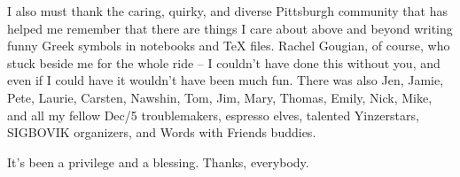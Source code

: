 \documentclass[12pt]{cmuthesis}
\begin{document}
\begin{acknowledgments}
  I also must thank the caring, quirky, and diverse Pittsburgh
  community that has helped me remember that there are things I care
  about above and beyond writing funny Greek symbols in notebooks and
  TeX files.  Rachel Gougian, of course, who stuck beside me for the
  whole ride -- I couldn't have done this without you, and even if I
  could have it wouldn't have been much fun. There was also Jen,
  Jamie, Pete, Laurie, Carsten, Nawshin, Tom, Jim, Mary, Thomas,
  Emily, Nick, Mike, and all my fellow Dec/5 troublemakers, espresso
  elves, talented Yinzerstars, SIGBOVIK organizers, and Words with
  Friends buddies.  

  It's been a privilege and a blessing. Thanks, everybody.

\end{acknowledgments}



\tableofcontents
\listoffigures %

\mainmatter


%
%
%
%
%
\end{document}

